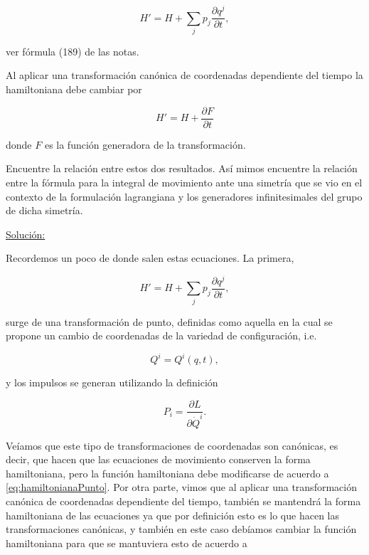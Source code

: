 \documentclass[a4paper,10pt]{article}
\numberwithin{equation}{section}
\begin{document}
$$
H' = H + \sum_j p_j \frac{\partial q^j}{\partial t},
$$

ver fórmula (189) de las notas.

\vspace{.3cm}

Al aplicar una transformación canónica de coordenadas dependiente del tiempo la 
hamiltoniana debe cambiar por 

$$
H' = H + \frac{\partial F}{\partial t}
$$

donde $F$ es la función generadora de la transformación. 

\vspace{.3cm}

Encuentre la relación entre estos dos resultados. Así mimos encuentre la relación 
entre la fórmula para la integral de movimiento ante una simetría que se vio en el 
contexto de la formulación lagrangiana y los generadores infinitesimales del grupo 
de dicha simetría.

\vspace{.3cm}

\underline{Solución:} \vspace{.3cm}

Recordemos un poco de donde salen estas ecuaciones. La primera,

\begin{equation} 
H' = H + \sum_j p_j \frac{\partial q^j}{\partial t},
\label{eq:hamiltonianaPunto}
\end{equation}

surge de una transformación de punto, definidas como aquella en la cual se propone 
un cambio de coordenadas de la variedad de configuración, i.e. 

\begin{equation}
 Q^i = Q^i(q,t),
\end{equation}

y los impulsos se generan utilizando la definición 

\begin{equation}
P_i = \frac{\partial L}{\partial \dot{Q}^i}.
\end{equation}

Veíamos que este tipo de transformaciones de coordenadas son canónicas, es decir, 
que hacen que las ecuaciones de movimiento conserven la forma hamiltoniana, pero 
la función hamiltoniana debe modificarse de acuerdo a \eqref{eq:hamiltonianaPunto}. 
Por otra parte, vimos que al aplicar una transformación canónica de coordenadas dependiente 
del tiempo, también se mantendrá la forma hamiltoniana de las ecuaciones ya que por 
definición esto es lo que hacen las transformaciones canónicas, y también en este 
caso debíamos cambiar la función hamiltoniana para que se mantuviera esto de acuerdo 
a 
\end{document}
